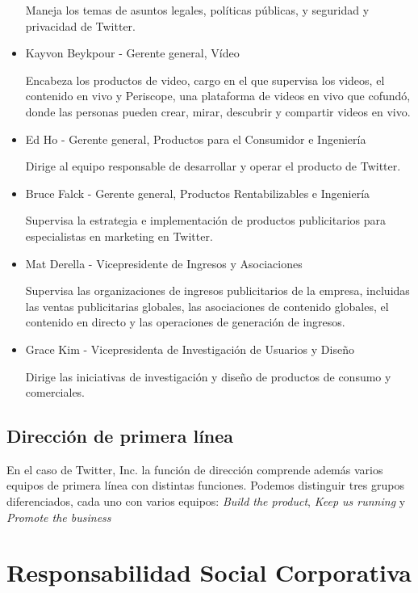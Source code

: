 \begin{itemize}
Maneja los temas de asuntos legales, políticas públicas, y seguridad y privacidad de Twitter.

\item Kayvon Beykpour - Gerente general, Vídeo

Encabeza los productos de video, cargo en el que supervisa los videos, el contenido en vivo y Periscope, una plataforma de videos en vivo que cofundó, donde las personas pueden crear, mirar, descubrir y compartir videos en vivo.

\item Ed Ho - Gerente general, Productos para el Consumidor e Ingeniería

Dirige al equipo responsable de desarrollar y operar el producto de Twitter.

\item Bruce Falck - Gerente general, Productos Rentabilizables e Ingeniería

Supervisa la estrategia e implementación de productos publicitarios para especialistas en marketing en Twitter.

\item Mat Derella - Vicepresidente de Ingresos y Asociaciones

Supervisa las organizaciones de ingresos publicitarios de la empresa, incluidas las ventas publicitarias globales, las asociaciones de contenido globales, el contenido en directo y las operaciones de generación de ingresos.

\item Grace Kim - Vicepresidenta de Investigación de Usuarios y Diseño

Dirige las iniciativas de investigación y diseño de productos de consumo y comerciales.

\end{itemize}

\subsection{Dirección de primera línea}

En el caso de Twitter, Inc. la función de dirección comprende además varios equipos de primera línea con distintas funciones. Podemos distinguir tres grupos diferenciados, cada uno con varios equipos: \textit{Build the product}, \textit{Keep us running} y \textit{Promote the business}

\section{Responsabilidad Social Corporativa}

